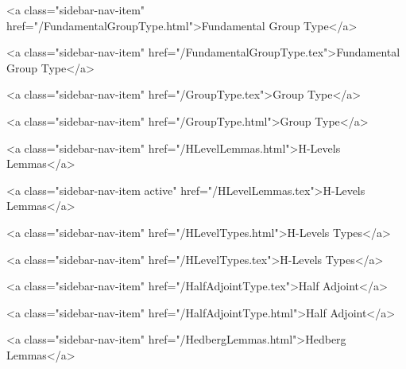       
        
          <a class="sidebar-nav-item" href="/FundamentalGroupType.html">Fundamental Group Type</a>
        
      
    
      
        
          <a class="sidebar-nav-item" href="/FundamentalGroupType.tex">Fundamental Group Type</a>
        
      
    
      
        
          <a class="sidebar-nav-item" href="/GroupType.tex">Group Type</a>
        
      
    
      
        
          <a class="sidebar-nav-item" href="/GroupType.html">Group Type</a>
        
      
    
      
        
          <a class="sidebar-nav-item" href="/HLevelLemmas.html">H-Levels Lemmas</a>
        
      
    
      
        
          <a class="sidebar-nav-item active" href="/HLevelLemmas.tex">H-Levels Lemmas</a>
        
      
    
      
        
          <a class="sidebar-nav-item" href="/HLevelTypes.html">H-Levels Types</a>
        
      
    
      
        
          <a class="sidebar-nav-item" href="/HLevelTypes.tex">H-Levels Types</a>
        
      
    
      
        
          <a class="sidebar-nav-item" href="/HalfAdjointType.tex">Half Adjoint</a>
        
      
    
      
        
          <a class="sidebar-nav-item" href="/HalfAdjointType.html">Half Adjoint</a>
        
      
    
      
        
          <a class="sidebar-nav-item" href="/HedbergLemmas.html">Hedberg Lemmas</a>
        
